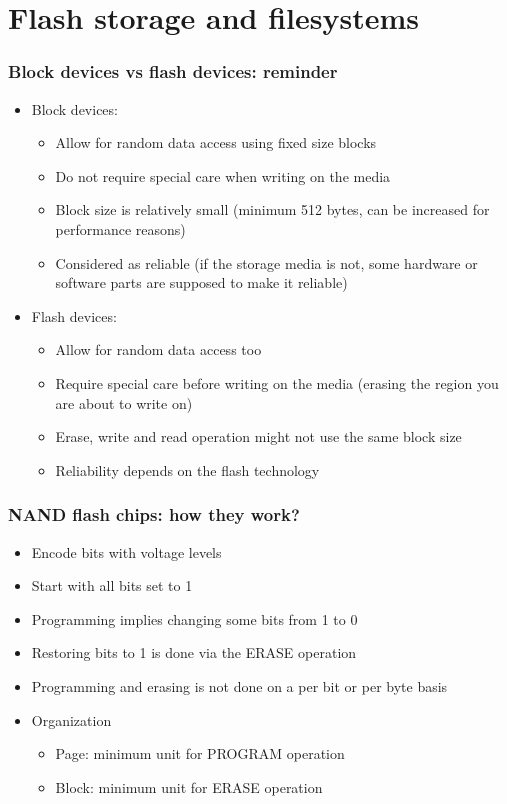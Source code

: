 \section{Flash storage and filesystems}

\begin{frame}
  \frametitle{Block devices vs flash devices: reminder}
  \begin{itemize}
  \item Block devices:
    \begin{itemize}
    \item Allow for random data access using fixed size blocks
    \item Do not require special care when writing on the media
    \item Block size is relatively small (minimum 512 bytes, can be
      increased for performance reasons)
    \item Considered as reliable (if the storage media is not, some
      hardware or software parts are supposed to make it reliable)
    \end{itemize}
  \item Flash devices:
    \begin{itemize}
    \item Allow for random data access too
    \item Require special care before writing on the media (erasing
      the region you are about to write on)
    \item Erase, write and read operation might not use the same block
      size
    \item Reliability depends on the flash technology
    \end{itemize}
  \end{itemize}
\end{frame}

\begin{frame}
  \frametitle{NAND flash chips: how they work?}
  \begin{itemize}
  \item Encode bits with voltage levels
  \item Start with all bits set to 1
  \item Programming implies changing some bits from 1 to 0
  \item Restoring bits to 1 is done via the ERASE operation
  \item Programming and erasing is not done on a per bit or per byte
    basis
  \item Organization
    \begin{itemize}
    \item Page: minimum unit for PROGRAM operation
    \item Block: minimum unit for ERASE operation
    \end{itemize}
  \end{itemize}
\end{frame}

